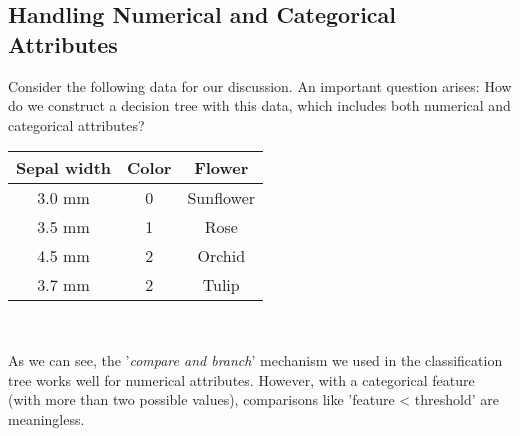 \documentclass[10pt,a4paper]{report}
\begin{document}
\subsection{Handling Numerical and Categorical Attributes}
Consider the following data for our discussion. An important question arises: How do we construct a decision tree with this data, which includes both numerical and categorical attributes?\\
\begin{center}
\begin{tabular}{ |c|c|c| } 
\hline
Sepal width&Color& Flower\\\hline\hline
3.0 mm & 0 & Sunflower \\\hline
3.5 mm & 1 & Rose \\\hline
4.5 mm & 2 & Orchid\\\hline
3.7 mm & 2 & Tulip\\\hline
\end{tabular}\\
\end{center}
As we can see, the '\textit{compare and branch}' mechanism we used in the classification tree works well for numerical attributes. However, with a categorical feature (with more than two possible values), comparisons like 'feature < threshold' are meaningless.
\end{document}
